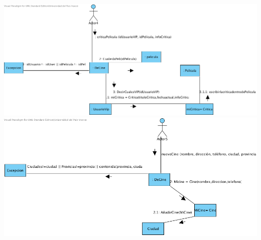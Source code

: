 \documentclass{article}
\begin{document}
\begin{center}
\includegraphics[width=1.3\linewidth]{./J-4}
\includegraphics[width=1.3\linewidth]{./J-5}
\end{center}
\pagebreak
\end{document}
